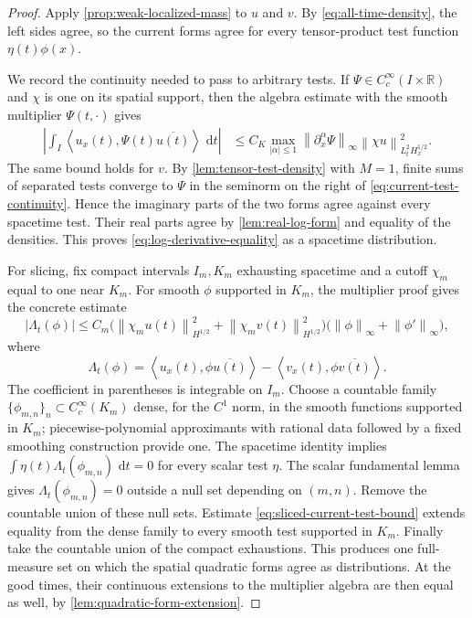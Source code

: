 \documentclass[11pt,oneside]{book}
\theoremstyle{definition}
\theoremstyle{remark}
\newcommand{\R}{\mathbb R}
\newcommand{\1}{\mathbf 1}
\newcommand{\dd}{\,\mathrm d}
\newcommand{\norm}[1]{\left\lVert #1\right\rVert}
\newcommand{\pair}[2]{\left\langle #1,#2\right\rangle}
\begin{document}
\begin{proof}
Apply \cref{prop:weak-localized-mass} to $u$ and $v$.  By
\eqref{eq:all-time-density}, the left sides agree, so the current forms agree
for every tensor-product test function $\eta(t)\phi(x)$.

We record the continuity needed to pass to arbitrary tests.  If
$\Psi\in C_c^\infty(I\times\R)$ and $\chi$ is one on its spatial support,
then the algebra estimate with the smooth multiplier $\Psi(t,\cdot)$ gives
\begin{align}
 \left|\int_I
 \pair{u_x(t)}{\Psi(t)\overline{u(t)}}\,\dd t\right|
 &\le C_K\max_{|\alpha|\le1}\norm{\partial_x^\alpha\Psi}_\infty
       \norm{\chi u}_{L^2_tH^{1/2}_x}^2.          \label{eq:current-test-continuity}
\end{align}
The same bound holds for $v$.  By \cref{lem:tensor-test-density} with $M=1$, finite sums of separated
tests converge to $\Psi$ in the seminorm on the right of
\eqref{eq:current-test-continuity}.  Hence the imaginary parts of the two
forms agree against every spacetime test.  Their
real parts agree by \cref{lem:real-log-form} and equality of the densities.
This proves \eqref{eq:log-derivative-equality} as a spacetime distribution.

For slicing, fix compact intervals $I_m,K_m$ exhausting spacetime and a
cutoff $\chi_m$ equal to one near $K_m$.  For smooth $\phi$ supported in
$K_m$, the multiplier proof gives the concrete estimate
\begin{equation}
 |\Lambda_t(\phi)|
 \le C_m\bigl(\norm{\chi_m u(t)}_{H^{1/2}}^2
              +\norm{\chi_m v(t)}_{H^{1/2}}^2\bigr)
       \bigl(\norm\phi_\infty+\norm{\phi'}_\infty\bigr),
 \label{eq:sliced-current-test-bound}
\end{equation}
where
\[
 \Lambda_t(\phi)=
 \pair{u_x(t)}{\phi\overline{u(t)}}
 -\pair{v_x(t)}{\phi\overline{v(t)}}.
\]
The coefficient in parentheses is integrable on $I_m$.  Choose a countable
family $\{\phi_{m,n}\}_n\subset C_c^\infty(K_m)$ dense, for the
$C^1$ norm, in the smooth functions supported in $K_m$; piecewise-polynomial
approximants with rational data followed by a fixed smoothing construction
provide one.  The spacetime identity implies
$\int\eta(t)\Lambda_t(\phi_{m,n})\,\dd t=0$ for every scalar test $\eta$.
The scalar fundamental lemma gives
$\Lambda_t(\phi_{m,n})=0$ outside a null set depending on $(m,n)$.  Remove
the countable union of these null sets.  Estimate
\eqref{eq:sliced-current-test-bound} extends equality from the dense family
to every smooth test supported in $K_m$.  Finally take the countable union
of the compact exhaustions.  This produces one full-measure set on which the
spatial quadratic forms agree as distributions.  At the good times, their
continuous extensions to the multiplier algebra are then equal as well, by
\cref{lem:quadratic-form-extension}.
\end{proof}
\end{document}
